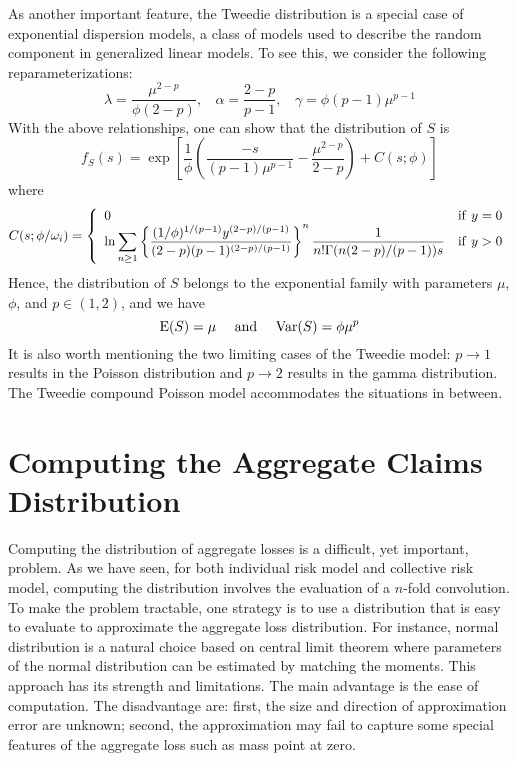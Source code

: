 \documentclass[12pt,letterpaper]{article}
\begin{document}
As another important feature, the Tweedie distribution is a special case of exponential dispersion models, a class of models used to describe the random component in generalized linear models. To see this, we consider the following reparameterizations:
\begin{equation*}
\lambda=\frac{\mu^{2-p}}{\phi(2-p)},~~~~\alpha=\frac{2-p}{p-1},~~~~\gamma=\phi(p-1)\mu^{p-1}
\end{equation*}
With the above relationships, one can show that the distribution of $S$ is
$$f_S(s)=\exp\left[\frac{1}{\phi}\left(\frac{-s}{(p-1)\mu^{p-1}}-\frac{\mu^{2-p}}{2-p}\right)+C(s;\phi)\right]$$
where
\begin{equation*}
C(s;\phi/\omega_i)=\left\{\begin{array}{ll}
                    \displaystyle 0 & {\rm if}~ y=0 \\
                   \displaystyle \ln \sum\limits_{n\ge 1} \left\{\frac{(1/\phi)^{1/(p-1)}y^{(2-p)/(p-1)}}{(2-p)(p-1)^{(2-p)/(p-1)}}\right\}^{n}\frac{1}{n!\Gamma(n(2-p)/(p-1))s} & {\rm if}~ y>0
                  \end{array}\right.
\end{equation*}
Hence, the distribution of $S$ belongs to the exponential family with parameters $\mu$, $\phi$, and $p\in(1,2)$, and we have
$${\rm E} (S)=\mu~~~~{\rm and}~~~~{\rm Var} (S)=\phi\mu^{p}$$
It is also worth mentioning the two limiting cases of the Tweedie model: $p\rightarrow 1$ results in the Poisson distribution and $p\rightarrow 2$ results in the gamma distribution. The Tweedie compound Poisson model accommodates the situations in between.




\section{Computing the Aggregate Claims Distribution}


Computing the distribution of aggregate losses is a difficult, yet important, problem. As we have seen, for both individual risk model and collective risk model, computing the distribution involves the evaluation of a $n$-fold convolution. To make the problem tractable, one strategy is to use a distribution that is easy to evaluate to approximate the aggregate loss distribution. For instance, normal distribution is a natural choice based on central limit theorem where parameters of the normal distribution can be estimated by matching the moments. This approach has its strength and limitations. The main advantage is the ease of computation. The disadvantage are: first, the size and direction of approximation error are unknown; second, the approximation may fail to capture some special features of the aggregate loss such as mass point at zero.
\end{document}
